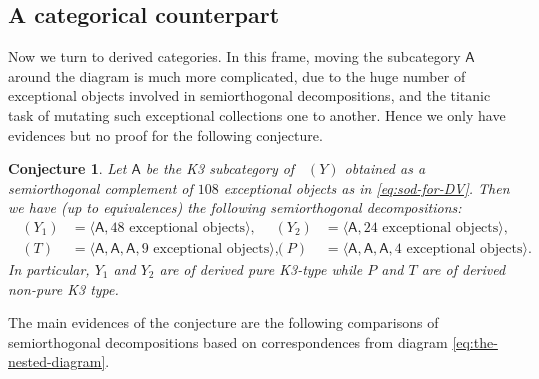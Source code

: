 \documentclass[11pt]{article}
\theoremstyle{plain}
\newtheorem{conjecture}[theorem]{Conjecture}
\theoremstyle{definition}
\newcommand{\cat}[1]{\mathsf{#1}}
\newcommand{\sod}[1]{\langle #1 \rangle}
\DeclareMathOperator{\Db}{{\cat{D}^{\mathrm{b}}}}
\begin{document}
\subsection{A categorical counterpart}
Now we turn to derived categories. In this frame, moving the subcategory $\cat{A}$ around the diagram is much more complicated, due to the huge number of exceptional objects involved in semiorthogonal decompositions, and the titanic task of mutating such exceptional collections one to another. Hence we only have evidences but no proof for the following conjecture.

\begin{conjecture}\label{conj:decompositions}
Let $\cat{A}$ be the K3 subcategory of $\Db(Y)$ obtained as a semiorthogonal complement of $108$ exceptional objects as in \eqref{eq:sod-for-DV}.
Then we have (up to equivalences) the following semiorthogonal decompositions:\vspace*{-3pt}
\begin{align*}
\Db(Y_1)&=\sod{\cat{A}, 48 \text{ exceptional objects}},&
\Db(Y_2)&=\sod{\cat{A}, 24 \text{ exceptional objects}},\\
\Db(T)&=\sod{\cat{A},\cat{A},\cat{A}, 9 \text{ exceptional objects}},&
\Db(P)&=\sod{\cat{A},\cat{A},\cat{A}, 4 \text{ exceptional objects}}.
\end{align*}
In particular, $Y_1$ and $Y_2$ are of derived pure K3-type while $P$ and $T$ are of
derived non-pure K3 type.
\end{conjecture}

The main evidences of the conjecture are the following comparisons of semiorthogonal
decompositions based on correspondences from diagram \eqref{eq:the-nested-diagram}.
\end{document}
